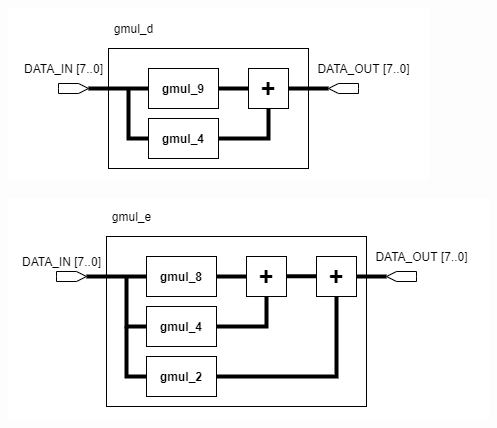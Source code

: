 \documentclass[a4paper, 10pt]{article}
\newenvironment{Figure}
    {\par\medskip\noindent\minipage{\linewidth}}
    {\endminipage\par\medskip}
\begin{document}
\begin{multicols}{2}
	\noindent
            \begin{Figure}
                \centering
                \includegraphics[width=\linewidth]{InvMixColumns-gmul_d.png}
                \label{fig:gmul-d}
            \end{Figure}

	\noindent
            \begin{Figure}
                \centering
                \includegraphics[width=\linewidth]{InvMixColumns-gmul_e.png}
                \label{fig:gmul-e}
            \end{Figure}


\end{multicols}
\end{document}
